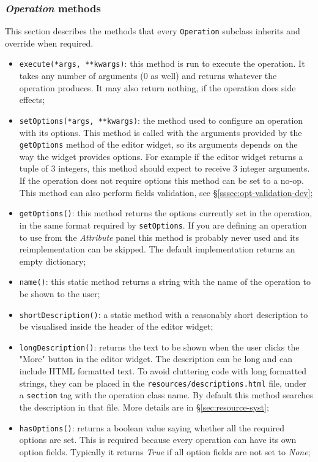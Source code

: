 \clearpage
\subsubsection{\textit{Operation} methods}
This section describes the methods that every \texttt{Operation} subclass inherits and override when required.
\begin{itemize}
	\item \texttt{execute(*args, **kwargs)}: this method is run to execute the operation. It takes any number of arguments (0 as well) and returns whatever the operation produces. It may also return nothing, if the operation does side effects;
	\item \texttt{setOptions(*args, **kwargs)}: the method used to configure an operation with its options. This method is called with the arguments provided by the \texttt{getOptions} method of the editor widget, so its arguments depends on the way the widget provides options. For example if the editor widget returns a tuple of 3 integers, this method should expect to receive 3 integer arguments. If the operation does not require options this method can be set to a no-op. This method can also perform fields validation, see §\ref{sssec:opt-validation-dev};
	\item \texttt{getOptions()}: this method returns the options currently set in the operation, in the same format required by \texttt{setOptions}. If you are defining an operation to use from the \textit{Attribute} panel this method is probably never used and its reimplementation can be skipped. The default implementation returns an empty dictionary;
	\item \texttt{name()}: this static method returns a string with the name of the operation to be shown to the user;
	\item \texttt{shortDescription()}: a static method with a reasonably short description to be visualised inside the header of the editor widget;
	\item \texttt{longDescription()}: returns the text to be shown when the user clicks the "More" button in the editor widget. The description can be long and can include HTML formatted text. To avoid cluttering code with long formatted strings, they can be placed in the \texttt{resources/descriptions.html} file, under a \texttt{section} tag with the operation class name. By default this method searches the description in that file. More details are in §\ref{sec:resource-syst};
	\item \texttt{hasOptions()}: returns a boolean value saying whether all the required options are set. This is required because every operation can have its own option fields. Typically it returns \textit{True} if all option fields are not set to \textit{None};

\end{itemize}
